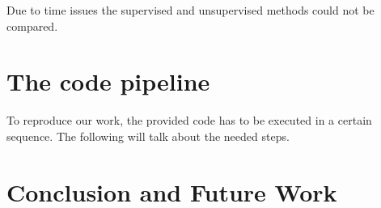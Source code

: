 \documentclass[10pt,a4paper]{article}
\begin{document}
	Due to time issues the supervised and unsupervised methods could not be compared.
	
	\section{The code pipeline}
	To reproduce our work, the provided code has to be executed in a certain sequence. The following will talk about the needed steps.
	
	
	\section{Conclusion and Future Work}
	
	
	\newpage
	
	\nocite{Zhang2014}
	\nocite{syntaxnet}

	
	
\end{document}
